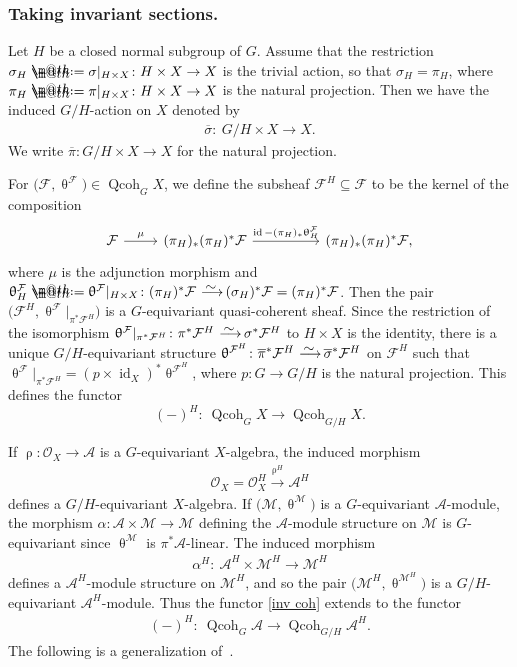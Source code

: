\documentclass[pdftex]{sigma}%
\makeatletter
\newcommand*{\defeq}{\mathrel{\rlap{%
 \raisebox{0.3ex}{$\m@th\cdot$}}%
 \raisebox{-0.3ex}{$\m@th\cdot$}}%
 =}
\numberwithin{equation}{section}
\newcommand{\Qcoh}{\operatorname{Qcoh}}
\newcommand{\id}{\operatorname{id}}
\newcommand{\cA}{\mathcal{A}}
\newcommand{\cF}{\mathcal{F}}
\newcommand{\cM}{\mathcal{M}}
\newcommand{\cO}{\mathcal{O}}
\newcommand{\simto}{\,\,\,\,\raisebox{4pt}{$\sim$}{\kern -1.1em \longrightarrow}\,}
\makeatother
\begin{document}
\subsubsection{Taking invariant sections.}
Let $H$ be a closed normal subgroup of $G$. Assume that the restriction $\sigma_H\defeq\sigma|_{H\times X}\colon H\times X\to X$ is the trivial action, so that $\sigma_H=\pi_H$, where $\pi_H\defeq\pi|_{H\times X}\colon H\times X\to X$ is the natural projection. Then we have the induced $G/H$-action on $X$ denoted by
\begin{gather*}
\overline{\sigma}\colon\ G/H\times X\to X.
\end{gather*}
We write $\overline{\pi}\colon G/H\times X\to X$ for the natural projection.

For $\big(\cF,\uptheta^{\cF}\big)\in\Qcoh_GX$, we define the subsheaf $\cF^H\subseteq\cF$ to be the kernel of the composition
\[
\begin{tikzcd}
\cF\arrow[r,"\mu"]&(\pi_H)_*(\pi_H)^* \cF\arrow[rr,"\id -(\pi_H)_*\uptheta_H^{\cF}"]&&(\pi_H)_*(\pi_H)^* \cF,
\end{tikzcd}
\]
 where $\mu$ is the adjunction morphism and $\uptheta^{\cF}_H\defeq\uptheta^{\cF}|_{H\times X}\colon (\pi_H)^*\cF\simto (\sigma_H)^*\cF=(\pi_H)^*\cF$.
Then the pair $\big(\cF^H,\uptheta^{\cF}|_{\pi^*\cF^H}\big)$ is a $G$-equivariant quasi-coherent sheaf. Since the restriction of the isomorphism $\uptheta^{\cF}|_{\pi^*\cF^H}\colon {\pi^*\cF^H}\simto {\sigma^*\cF^H}$ to $H\times X$ is the identity, there is a unique $G/H$-equivariant structure $\uptheta^{\cF^H}\colon \overline{\pi}^*\cF^H\simto \overline{\sigma}^*\cF^H$ on $\cF^H$ such that $\uptheta^{\cF}|_{\pi^*\cF^H}={(p\times \id _X)}^*\uptheta^{\cF^H}$, where $p\colon G\to G/H$ is the natural projection. This defines the functor
\begin{equation}\label{inv coh}
(-)^H\colon\ \Qcoh_GX\to \Qcoh_{G/H}X.
\end{equation}

If $\uprho\colon\cO_X\to\cA$ is a $G$-equivariant $X$-algebra, the induced morphism
\begin{gather*}
\cO_X=\cO_X^H\xrightarrow{\uprho^H}\cA^H
\end{gather*}
defines a $G/H$-equivariant $X$-algebra. If $\big(\cM,\uptheta^{\cM}\big)$ is a $G$-equivariant $\cA$-module, the morphism $\alpha\colon \cA\times \cM\to \cM$ defining the $\cA$-module structure on $\cM$ is $G$-equivariant since $\uptheta^{\cM}$ is $\pi^*\cA$-linear. The induced morphism
\begin{gather*}
\alpha^H\colon\ \cA^H\times \cM^H\to \cM^H
\end{gather*}
 defines a $\cA^H$-module structure on $\cM^H$, and so the pair $\big(\cM^H,\uptheta^{\cM^H}\big)$ is a $G/H$-equivariant $\cA^H$-module. Thus the functor \eqref{inv coh} extends to the functor
\begin{gather*}
(-)^H\colon\ \Qcoh_G\cA\to \Qcoh_{G/H}\cA^H.
\end{gather*}
The following is a generalization of~\cite[Lemma~2.22]{bfk}.
\end{document}
